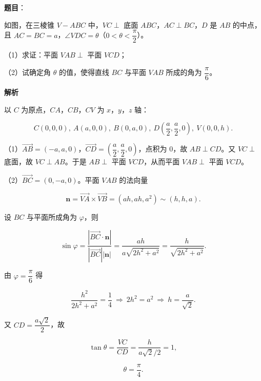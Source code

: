 \begin{answer}

\textbf{题目}：

如图，在三棱锥 $V-ABC$ 中，$VC\perp$ 底面 $ABC$，$AC\perp BC$，$D$ 是 $AB$ 的中点，且 $AC=BC=a$，$\angle VDC=\theta$（$0<\theta<\dfrac{\pi}{2}$）。

（1）求证：平面 $VAB\perp$ 平面 $VCD$；

（2）试确定角 $\theta$ 的值，使得直线 $BC$ 与平面 $VAB$ 所成的角为 $\dfrac{\pi}{6}$。
\nopagebreak[4]
\begin{center}\end{center}
\nopagebreak[4]
\textbf{解析}

以 $C$ 为原点，$CA$，$CB$，$CV$ 为 $x$，$y$，$z$ 轴：

\nopagebreak[4]
\[C(0,0,0),\ A(a,0,0),\ B(0,a,0),\ D\left(\frac a2,\frac a2,0\right),\ V(0,0,h).\]

（1）$\overrightarrow{AB}=(-a,a,0)$，$\overrightarrow{CD}=\left(\dfrac a2,\dfrac a2,0\right)$，点积为 $0$，故 $AB\perp CD$。又 $VC\perp$ 底面，故 $VC\perp AB$。于是 $AB\perp$ 平面 $VCD$，从而平面 $VAB\perp$ 平面 $VCD$。

（2）$\overrightarrow{BC}=(0,-a,0)$。平面 $VAB$ 的法向量

\nopagebreak[4]
\[\boldsymbol n=\overrightarrow{VA}\times\overrightarrow{VB}=(ah,ah,a^2)\sim(h,h,a).\]

设 $BC$ 与平面所成角为 $\varphi$，则

\nopagebreak[4]
\[\sin\varphi=\frac{|\overrightarrow{BC}\cdot\boldsymbol n|}{|\overrightarrow{BC}||\boldsymbol n|}
=\frac{ah}{a\sqrt{2h^2+a^2}}=\frac{h}{\sqrt{2h^2+a^2}}.\]

由 $\varphi=\dfrac{\pi}{6}$ 得

\nopagebreak[4]
\[\frac{h^2}{2h^2+a^2}=\frac14\ \Rightarrow\ 2h^2=a^2\ \Rightarrow\ h=\frac a{\sqrt2}.\]

又 $CD=\dfrac{a\sqrt2}{2}$，故

\nopagebreak[4]
\[\tan\theta=\frac{VC}{CD}=\frac{h}{a\sqrt2/2}=1,\]

\nopagebreak[4]
\[\theta=\frac{\pi}{4}.\]


\end{answer}
